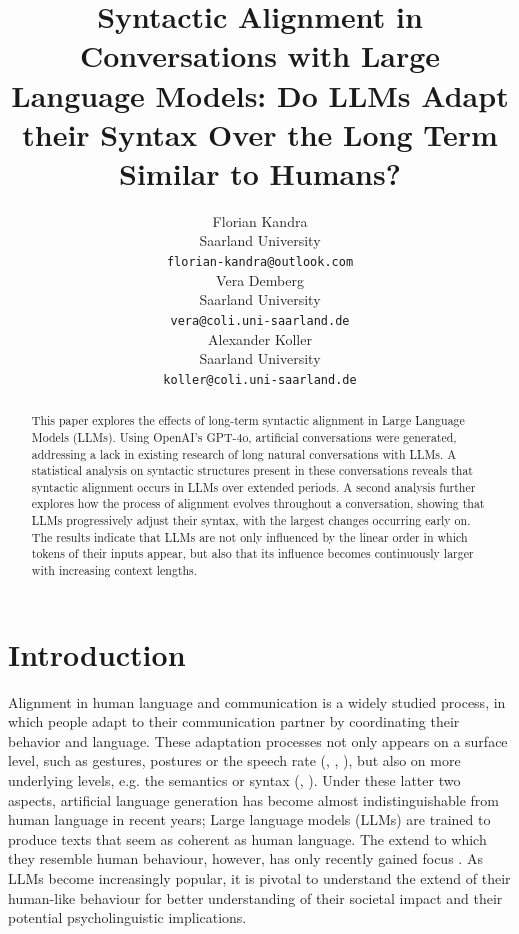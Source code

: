 \documentclass[11pt]{article}
\title{Syntactic Alignment in Conversations with Large Language Models: Do LLMs Adapt their Syntax Over the Long Term Similar to Humans?}
\author{Florian Kandra \\
  Saarland University \\
  \texttt{florian-kandra@outlook.com} \\\And
  Vera Demberg \\
  Saarland University \\
  \texttt{vera@coli.uni-saarland.de} \\\AND
  Alexander Koller \\
  Saarland University \\
  \texttt{koller@coli.uni-saarland.de} \\}
\begin{document}
\maketitle
\begin{abstract}
This paper explores the effects of long-term syntactic alignment in Large Language Models (LLMs). Using OpenAI's GPT-4o, artificial conversations were generated, addressing a lack in existing research of long natural conversations with LLMs.
A statistical analysis on syntactic structures present in these conversations reveals that syntactic alignment occurs in LLMs over extended periods. A second analysis further explores how the process of alignment evolves throughout a conversation, showing that LLMs progressively adjust their syntax, with the largest changes occurring early on.
The results indicate that LLMs are not only influenced by the linear order in which tokens of their inputs appear, but also that its influence becomes continuously larger with increasing context lengths.
\end{abstract}

\section{Introduction}

Alignment in human language and communication is a widely studied process, in which people adapt to their communication partner by coordinating their behavior and language. These adaptation processes not only appears on a surface level, such as gestures, postures or the speech rate (\citealp{Holler2011mimicry}, \citealp{shockley2009coordinative}, \citealp{jungers2009speech}), but also on more underlying levels, e.g. the semantics or syntax (\citealp{BOCK1986355}, \citealp{garrod1987semanticcoord}).
Under these latter two aspects, artificial language generation has become almost indistinguishable from human language in recent years;
Large language models (LLMs) are trained to produce texts that seem as coherent as human language. The extend to which they resemble human behaviour, however, has only recently gained focus \cite{cai2024largelanguagemodelsresemble}. As LLMs become increasingly popular, it is pivotal to understand the extend of their human-like behaviour for better understanding of their societal impact and their potential psycholinguistic implications. 
\end{document}

